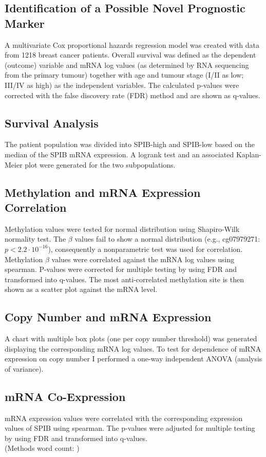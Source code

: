 \subsection{Identification of a Possible Novel Prognostic Marker}

A multivariate Cox proportional hazards regression model was created with data from 1218 breast cancer patients.
Overall survival was defined as the dependent (outcome) variable and mRNA log values (as determined by RNA sequencing from the primary tumour) together with age and tumour stage (I/II as low; III/IV as high) as the independent variables.
The calculated p-values were corrected with the false discovery rate (FDR) method and are shown as q-values.

\subsection{Survival Analysis}

The patient population was divided into SPIB-high and SPIB-low based on the median of the SPIB mRNA expression.
A logrank test and an associated Kaplan-Meier plot were generated for the two subpopulations.

\subsection{Methylation and mRNA Expression Correlation}

Methylation values were tested for normal distribution using Shapiro-Wilk normality test.
The $\beta$ values fail to show a normal distribution (e.g., cg07979271: ${p < 2.2 \cdot 10^{-16}}$), consequently a nonparametric test was used for correlation.
Methylation $\beta$ values were correlated against the mRNA log values using spearman.
P-values were corrected for multiple testing by using FDR and transformed into q-values.
The most anti-correlated methylation site is then shown as a scatter plot against the mRNA level.

\subsection{Copy Number and mRNA Expression}

A chart with multiple box plots (one per copy number threshold) was generated displaying the corresponding mRNA log values.
To test for dependence of mRNA expression on copy number I performed a one-way independent ANOVA (analysis of variance).

\subsection{mRNA Co-Expression}

mRNA expression values were correlated with the corresponding expression values of SPIB using spearman.
The p-values were adjusted for multiple testing by using FDR and transformed into q-values.
\\
\endcountem
(Methods word count: \thewordcount{})